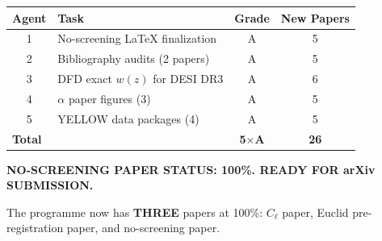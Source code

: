\documentclass[11pt,a4paper]{article}
\begin{document}
\begin{center}
\begin{tabular}{clcc}
\toprule
\textbf{Agent} & \textbf{Task} & \textbf{Grade} & \textbf{New Papers} \\
\midrule
1 & No-screening LaTeX finalization & A & 5 \\
2 & Bibliography audits (2 papers) & A & 5 \\
3 & DFD exact $w(z)$ for DESI DR3 & A & 6 \\
4 & $\alpha$ paper figures (3) & A & 5 \\
5 & YELLOW data packages (4) & A & 5 \\
\midrule
\multicolumn{2}{l}{\textbf{Total}} & \textbf{5$\times$A} & \textbf{26} \\
\bottomrule
\end{tabular}
\end{center}

\textbf{NO-SCREENING PAPER STATUS: 100\%. READY FOR arXiv SUBMISSION.}

The programme now has \textbf{THREE} papers at 100\%: $C_\ell$ paper, Euclid pre-registration paper, and no-screening paper.
\end{document}
